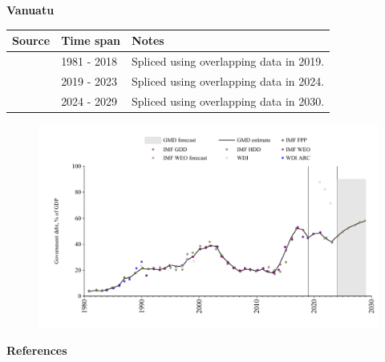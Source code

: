 \documentclass[12pt,a4paper,landscape]{article}
\begin{document}
\begin{adjustbox}{max totalsize={\paperwidth}{\paperheight},center}
\begin{minipage}[t][\textheight][t]{\textwidth}
\vspace*{0.5cm}
{}
\begin{center}
{\Large\bfseries Vanuatu}
\end{center}
\vspace{0.5cm}
\begin{table}[H]
\centering
\small
\begin{tabular}{|l|l|l|}
\hline
\textbf{Source} & \textbf{Time span} & \textbf{Notes} \\
\hline
\rowcolor{white}\cite{IMF_GDD}& 1981 - 2018 &Spliced using overlapping data in 2019.\\
\rowcolor{lightgray}\cite{IMF_FPP}& 2019 - 2023 &Spliced using overlapping data in 2024.\\
\rowcolor{white}\cite{IMF_WEO_forecast}& 2024 - 2029 &Spliced using overlapping data in 2030.\\
\hline
\end{tabular}
\end{table}
\begin{figure}[H]
\centering
\includegraphics[width=\textwidth,height=0.6\textheight,keepaspectratio]{graphs/VUT_govdebt_GDP.pdf}
\end{figure}
\end{minipage}
\end{adjustbox}
{}
\begin{center}
{\Large\bfseries References}
\end{center}
\small


\end{document}
